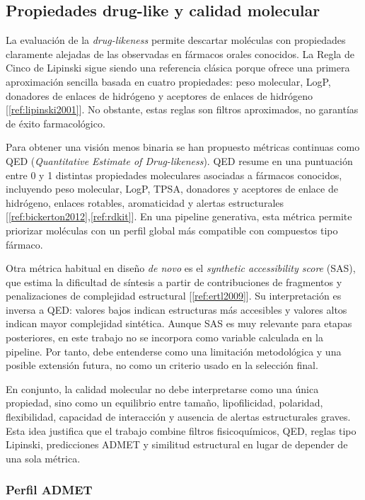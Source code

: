 \documentclass[IB]{TFUOC}%
\begin{document}
\subsection{Propiedades drug-like y calidad molecular}

La evaluación de la \textit{drug-likeness} permite descartar moléculas con propiedades claramente alejadas de las observadas en fármacos orales conocidos. La Regla de Cinco de Lipinski sigue siendo una referencia clásica porque ofrece una primera aproximación sencilla basada en cuatro propiedades: peso molecular, LogP, donadores de enlaces de hidrógeno y aceptores de enlaces de hidrógeno [\ref{ref:lipinski2001}]. No obstante, estas reglas son filtros aproximados, no garantías de éxito farmacológico.

Para obtener una visión menos binaria se han propuesto métricas continuas como QED (\textit{Quantitative Estimate of Drug-likeness}). QED resume en una puntuación entre 0 y 1 distintas propiedades moleculares asociadas a fármacos conocidos, incluyendo peso molecular, LogP, TPSA, donadores y aceptores de enlace de hidrógeno, enlaces rotables, aromaticidad y alertas estructurales [\ref{ref:bickerton2012},\ref{ref:rdkit}]. En una pipeline generativa, esta métrica permite priorizar moléculas con un perfil global más compatible con compuestos tipo fármaco.

Otra métrica habitual en diseño \textit{de novo} es el \textit{synthetic accessibility score} (SAS), que estima la dificultad de síntesis a partir de contribuciones de fragmentos y penalizaciones de complejidad estructural [\ref{ref:ertl2009}]. Su interpretación es inversa a QED: valores bajos indican estructuras más accesibles y valores altos indican mayor complejidad sintética. Aunque SAS es muy relevante para etapas posteriores, en este trabajo no se incorpora como variable calculada en la pipeline. Por tanto, debe entenderse como una limitación metodológica y una posible extensión futura, no como un criterio usado en la selección final.

En conjunto, la calidad molecular no debe interpretarse como una única propiedad, sino como un equilibrio entre tamaño, lipofilicidad, polaridad, flexibilidad, capacidad de interacción y ausencia de alertas estructurales graves. Esta idea justifica que el trabajo combine filtros fisicoquímicos, QED, reglas tipo Lipinski, predicciones ADMET y similitud estructural en lugar de depender de una sola métrica.

\subsubsection{Perfil ADMET}
\end{document}
